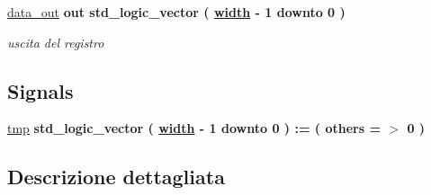 \begin{DoxyCompactItemize}
\hyperlink{group___generic_buffer_ga0bf60a72cb11ffe1945b82ce0bb86a57}{data\+\_\+out}  {\bfseries {\bfseries \textcolor{vhdlchar}{out}\textcolor{vhdlchar}{ }}} {\bfseries \textcolor{vhdlchar}{std\+\_\+logic\+\_\+vector}\textcolor{vhdlchar}{ }\textcolor{vhdlchar}{(}\textcolor{vhdlchar}{ }\textcolor{vhdlchar}{ }\textcolor{vhdlchar}{ }\textcolor{vhdlchar}{ }{\bfseries \hyperlink{group___generic_buffer_gae47d961480346c1d82439a66505e6e7d}{width}} \textcolor{vhdlchar}{-\/}\textcolor{vhdlchar}{ } \textcolor{vhdldigit}{1} \textcolor{vhdlchar}{ }\textcolor{vhdlchar}{downto}\textcolor{vhdlchar}{ }\textcolor{vhdlchar}{ } \textcolor{vhdldigit}{0} \textcolor{vhdlchar}{ }\textcolor{vhdlchar}{)}\textcolor{vhdlchar}{ }} 
\begin{DoxyCompactList}\small\item\em uscita del registro \end{DoxyCompactList}\end{DoxyCompactItemize}
\subsection*{Signals}
 \begin{DoxyCompactItemize}
\item 
\hyperlink{group___generic_buffer_gab94e66105790803865249c33633e359f}{tmp} {\bfseries \textcolor{vhdlchar}{std\+\_\+logic\+\_\+vector}\textcolor{vhdlchar}{ }\textcolor{vhdlchar}{(}\textcolor{vhdlchar}{ }\textcolor{vhdlchar}{ }\textcolor{vhdlchar}{ }\textcolor{vhdlchar}{ }{\bfseries \hyperlink{group___generic_buffer_gae47d961480346c1d82439a66505e6e7d}{width}} \textcolor{vhdlchar}{-\/}\textcolor{vhdlchar}{ } \textcolor{vhdldigit}{1} \textcolor{vhdlchar}{ }\textcolor{vhdlchar}{downto}\textcolor{vhdlchar}{ }\textcolor{vhdlchar}{ } \textcolor{vhdldigit}{0} \textcolor{vhdlchar}{ }\textcolor{vhdlchar}{)}\textcolor{vhdlchar}{ }\textcolor{vhdlchar}{ }\textcolor{vhdlchar}{ }\textcolor{vhdlchar}{\+:}\textcolor{vhdlchar}{=}\textcolor{vhdlchar}{ }\textcolor{vhdlchar}{(}\textcolor{vhdlchar}{ }\textcolor{vhdlchar}{ }\textcolor{vhdlchar}{others}\textcolor{vhdlchar}{ }\textcolor{vhdlchar}{ }\textcolor{vhdlchar}{=}\textcolor{vhdlchar}{ }\textcolor{vhdlchar}{$>$}\textcolor{vhdlchar}{ }\textcolor{vhdlchar}{\textquotesingle{}}\textcolor{vhdlchar}{ } \textcolor{vhdldigit}{0} \textcolor{vhdlchar}{ }\textcolor{vhdlchar}{\textquotesingle{}}\textcolor{vhdlchar}{ }\textcolor{vhdlchar}{)}\textcolor{vhdlchar}{ }} 
\end{DoxyCompactItemize}


\subsection{Descrizione dettagliata}


